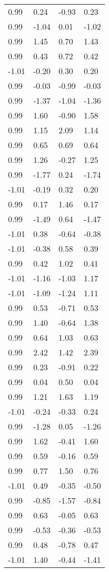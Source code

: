 \documentclass[
  doc,draftall]{apa6}
\begin{document}
\begin{table}[tbp]
\begin{center}
\begin{threeparttable}
\begin{tabular}{llll}
0.99 & 0.24 & -0.93 & 0.23\\
0.99 & -1.04 & 0.01 & -1.02\\
0.99 & 1.45 & 0.70 & 1.43\\
0.99 & 0.43 & 0.72 & 0.42\\
-1.01 & -0.20 & 0.30 & 0.20\\
0.99 & -0.03 & -0.99 & -0.03\\
0.99 & -1.37 & -1.04 & -1.36\\
0.99 & 1.60 & -0.90 & 1.58\\
0.99 & 1.15 & 2.09 & 1.14\\
0.99 & 0.65 & 0.69 & 0.64\\
0.99 & 1.26 & -0.27 & 1.25\\
0.99 & -1.77 & 0.24 & -1.74\\
-1.01 & -0.19 & 0.32 & 0.20\\
0.99 & 0.17 & 1.46 & 0.17\\
0.99 & -1.49 & 0.64 & -1.47\\
-1.01 & 0.38 & -0.64 & -0.38\\
-1.01 & -0.38 & 0.58 & 0.39\\
0.99 & 0.42 & 1.02 & 0.41\\
-1.01 & -1.16 & -1.03 & 1.17\\
-1.01 & -1.09 & -1.24 & 1.11\\
0.99 & 0.53 & -0.71 & 0.53\\
0.99 & 1.40 & -0.64 & 1.38\\
0.99 & 0.64 & 1.03 & 0.63\\
0.99 & 2.42 & 1.42 & 2.39\\
0.99 & 0.23 & -0.91 & 0.22\\
0.99 & 0.04 & 0.50 & 0.04\\
0.99 & 1.21 & 1.63 & 1.19\\
-1.01 & -0.24 & -0.33 & 0.24\\
0.99 & -1.28 & 0.05 & -1.26\\
0.99 & 1.62 & -0.41 & 1.60\\
0.99 & 0.59 & -0.16 & 0.59\\
0.99 & 0.77 & 1.50 & 0.76\\
-1.01 & 0.49 & -0.35 & -0.50\\
0.99 & -0.85 & -1.57 & -0.84\\
0.99 & 0.63 & -0.05 & 0.63\\
0.99 & -0.53 & -0.36 & -0.53\\
0.99 & 0.48 & -0.78 & 0.47\\
-1.01 & 1.40 & -0.44 & -1.41\\

\end{tabular}
\end{threeparttable}
\end{center}
\end{table}
\end{document}
